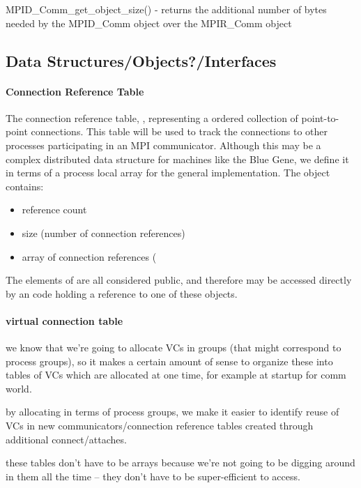 MPID_Comm_get_object_size()
- returns the additional number of bytes needed by the MPID_Comm object over
  the MPIR_Comm object


\subsection{Data Structures/Objects?/Interfaces}

\paragraph{Connection Reference Table}

The connection reference table, , representing a ordered
collection of point-to-point connections.  This table will be used to track
the connections to other processes participating in an MPI communicator.
Although this may be a complex distributed data structure for machines like
the Blue Gene, we define it in terms of a process local array for the general
implementation.  The  object contains:
\begin{itemize}
\item reference count
\item size (number of connection references)
\item array of connection references (
\end{itemize}
The elements of  are all considered public, and therefore may be
accessed directly by an code holding a reference to one of these objects.

\paragraph{virtual connection table}

we know that we're going to allocate VCs in groups (that might correspond to
process groups), so it makes a certain amount of sense to organize these into
tables of VCs which are allocated at one time, for example at startup for comm
world.

by allocating in terms of process groups, we make it easier to identify reuse
of VCs in new communicators/connection reference tables created through
additional connect/attaches.

these tables don't have to be arrays because we're not going to be digging
around in them all the time -- they don't have to be super-efficient to access.


